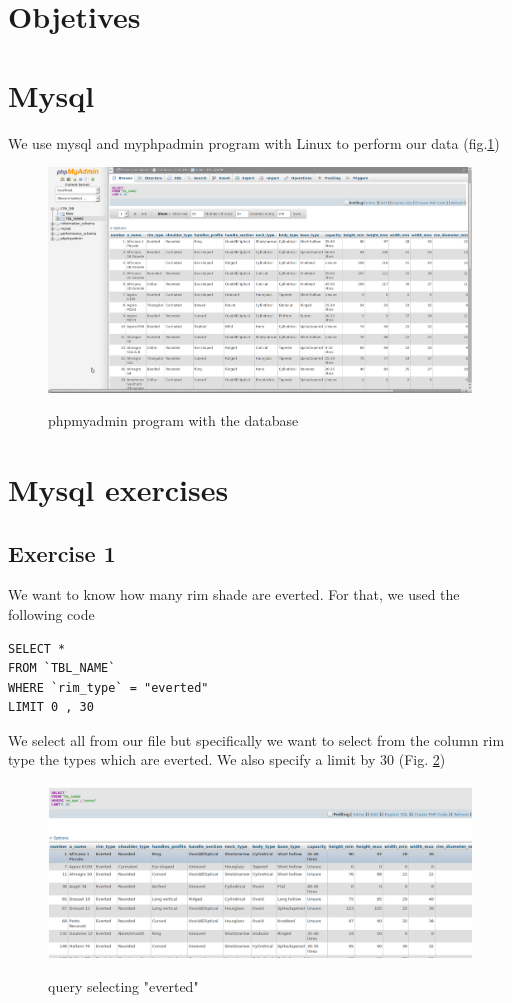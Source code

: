 \documentclass[10pt,a4paper]{article}
\begin{document}
\section{Objetives}



\section{Mysql}

We use mysql and myphpadmin program with Linux to perform our data (fig.\ref{myphp})

\begin{figure}[hdp]
	\centering
\includegraphics[scale=0.30]{picture2.png}
\label{myphp}
\caption{phpmyadmin program with the database}
\end{figure} 

\section{Mysql exercises}

\subsection{Exercise 1}

We want to know how many rim shade are everted. For that, we used the following code

\begin{verbatim}
SELECT *
FROM `TBL_NAME`
WHERE `rim_type` = "everted"
LIMIT 0 , 30
\end{verbatim}


We select all from our file but specifically we want to select from the column rim type the types which are everted. We also specify a limit by 30 (Fig. \ref{query1})

\begin{figure}[hdp]
\centering
\includegraphics[scale=0.30]{output_query1.png}
\label{query1}
\caption{query selecting "everted"}
\end{figure} 
\end{document}
